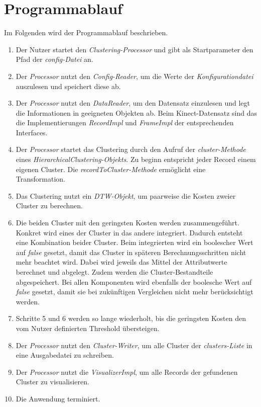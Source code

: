 \section{Programmablauf}
\label{4-Programmablauf}
Im Folgenden wird der Programmablauf beschrieben.
\begin{enumerate}
    \item Der Nutzer startet den \emph{Clustering-Processor}
    und gibt als Startparameter den Pfad der \emph{config-Datei} an.
    \item Der \emph{Processor} nutzt den \emph{Config-Reader}, um die Werte der \emph{Konfigurationdatei} auszulesen
    und speichert diese ab.
    \item Der \emph{Processor} nutzt den \emph{DataReader}, um den Datensatz einzulesen
    und legt die Informationen in geeigneten Objekten ab.
    Beim Kinect-Datensatz sind das die Implementierungen \emph{RecordImpl} und \emph{FrameImpl}
    der entsprechenden Interfaces.
    \item Der \emph{Processor} startet das Clustering durch den Aufruf der \emph{cluster-Methode}
    eines \emph{HierarchicalClustering-Objekts}.
    Zu beginn entspricht jeder Record einem eigenen Cluster.
    Die \emph{recordToCluster-Methode} ermöglicht eine Transformation.
    \item Das Clustering nutzt ein \emph{\ac{DTW}-Objekt},
    um paarweise die Kosten zweier Cluster zu berechnen.
    \item Die beiden Cluster mit den geringsten Kosten werden zusammengeführt.
    Konkret wird eines der Cluster in das andere integriert.
    Dadurch entsteht eine Kombination beider Cluster.
    Beim integrierten wird ein boolescher Wert auf \emph{false} gesetzt,
    damit das Cluster in späteren Berechnungsschritten nicht mehr beachtet wird.
    Dabei wird jeweils das Mittel der Attributwerte berechnet und abgelegt.
    Zudem werden die Cluster-Bestandteile abgespeichert.
    Bei allen Komponenten wird ebenfalls der boolesche Wert auf \emph{false} gesetzt,
    damit sie bei zukünftigen Vergleichen nicht mehr berücksichtigt werden.
    \item Schritte 5 und 6 werden so lange wiederholt, bis die geringsten Kosten den vom Nutzer definierten Threshold übersteigen.
    \item Der \emph{Processor} nutzt den \emph{Cluster-Writer}, um alle Cluster der \emph{clusters-Liste}
    in eine Ausgabedatei zu schreiben.
    \item Der \emph{Processor} nutzt die \emph{VisualizerImpl}, um alle Records der gefundenen Cluster zu visualisieren.
    \item Die Anwendung terminiert. 
\end{enumerate}
